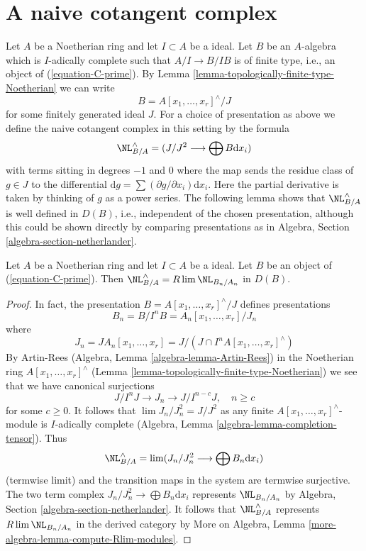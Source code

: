 \section{A naive cotangent complex}
\label{section-naive-cotangent-complex}

\noindent
Let $A$ be a Noetherian ring and let $I \subset A$ be a ideal.
Let $B$ be an $A$-algebra which is $I$-adically complete such
that $A/I \to B/IB$ is of finite type, i.e., an object of
(\ref{equation-C-prime}).
By Lemma \ref{lemma-topologically-finite-type-Noetherian} we can write
$$
B = A[x_1, \ldots, x_r]^\wedge / J
$$
for some finitely generated ideal $J$. For a choice of presentation as
above we define the naive cotangent complex in this setting by the formula
\begin{equation}
\label{equation-NL}
\NL^\wedge_{B/A} = (J/J^2 \longrightarrow \bigoplus B\text{d}x_i)
\end{equation}
with terms sitting in degrees $-1$ and $0$
where the map sends the residue class of $g \in J$ to the differential
$\text{d}g = \sum (\partial g/\partial x_i) \text{d}x_i$. Here
the partial derivative is taken by thinking of $g$ as a power series.
The following lemma shows that $\NL^\wedge_{B/A}$ is well defined
in $D(B)$, i.e., independent of the chosen presentation, although this
could be shown directly by comparing presentations as in
Algebra, Section \ref{algebra-section-netherlander}.

\begin{lemma}
\label{lemma-NL-is-limit}
Let $A$ be a Noetherian ring and let $I \subset A$ be a ideal.
Let $B$ be an object of (\ref{equation-C-prime}). Then
$\NL^\wedge_{B/A} = R\lim \NL_{B_n/A_n}$ in $D(B)$.
\end{lemma}

\begin{proof}
In fact, the presentation $B = A[x_1, \ldots, x_r]^\wedge / J$
defines presentations
$$
B_n = B/I^nB = A_n[x_1, \ldots, x_r]/J_n
$$
where
$$
J_n = JA_n[x_1, \ldots, x_r] =
J/(J \cap I^nA[x_1, \ldots, x_r]^\wedge)
$$
By Artin-Rees (Algebra, Lemma \ref{algebra-lemma-Artin-Rees})
in the Noetherian ring $A[x_1, \ldots, x_r]^\wedge$
(Lemma \ref{lemma-topologically-finite-type-Noetherian})
we see that we have canonical surjections
$$
J/I^nJ \to J_n \to J/I^{n - c}J,\quad n \geq c
$$
for some $c \geq 0$.
It follows that $\lim J_n/J_n^2 = J/J^2$ as any finite
$A[x_1, \ldots, x_r]^\wedge$-module is $I$-adically complete
(Algebra, Lemma \ref{algebra-lemma-completion-tensor}).
Thus
$$
\NL^\wedge_{B/A} =
\lim (J_n/J_n^2 \longrightarrow \bigoplus B_n \text{d}x_i)
$$
(termwise limit)
and the transition maps in the system are termwise surjective.
The two term complex $J_n/J_n^2 \longrightarrow \bigoplus B_n \text{d}x_i$
represents $\NL_{B_n/A_n}$ by
Algebra, Section \ref{algebra-section-netherlander}.
It follows that $\NL^\wedge_{B/A}$ represents
$R\lim \NL_{B_n/A_n}$ in the derived category by
More on Algebra, Lemma \ref{more-algebra-lemma-compute-Rlim-modules}.
\end{proof}

